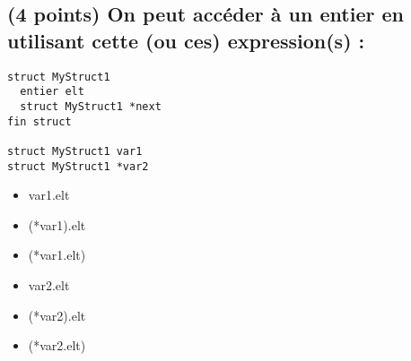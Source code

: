 \documentclass[11pt,a4paper]{article}
\begin{document}
\vfillLast

\newpage

\vfillFirst


\subsection{(4 points) On peut accéder à un entier en utilisant cette (ou ces) expression(s) : }

\begin{center}
\begin{lstlisting}[style=algorithmique]
struct MyStruct1
  entier elt
  struct MyStruct1 *next
fin struct 

struct MyStruct1 var1
struct MyStruct1 *var2 \end{lstlisting}
\end{center}



\begin{table}[ht!]
  \centering
  \begin{minipage}{0.45\textwidth}
    \centering
\begin{itemize}
  \item[\CaseCoche] var1.elt    \phantom{()} \\
  \item[\CaseCoche] (*var1).elt \\
  \item[\CaseCoche] (*var1.elt) \\
\end{itemize}
  \end{minipage}
  \hfillx
  \begin{minipage}{0.45\textwidth}
    \centering
\begin{itemize}
  \item[\CaseCoche] var2.elt    \phantom{()} \\
  \item[\CaseCoche] (*var2).elt \\
  \item[\CaseCoche] (*var2.elt) \\
\end{itemize}
  \end{minipage}
\end{table}


\bigskip
\end{document}
